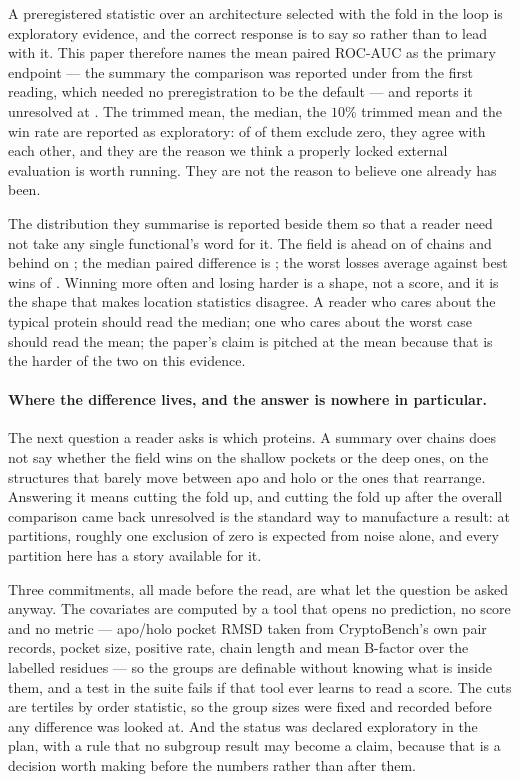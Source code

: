 \documentclass[11pt]{article}
\begin{document}
A preregistered statistic over an architecture selected with the fold in the loop
is exploratory evidence, and the correct response is to say so rather than to
lead with it. This paper therefore names the mean paired ROC-AUC as the primary
endpoint --- the summary the comparison was reported under from the first
reading, which needed no preregistration to be the default --- and reports it
unresolved at \TabAucD{} \TabAucDCI{}. The trimmed mean, the median, the
\(10\%\) trimmed mean and the win rate are reported as exploratory:
\EndNExploratoryResolving{} of \EndNExploratory{} of them exclude zero, they
agree with each other, and they are the reason we think a properly locked
external evaluation is worth running. They are not the reason to believe one
already has been.

The distribution they summarise is reported beside them so that a reader need not
take any single functional's word for it. The field is ahead on \EndWins{} of
\NUnits{} chains and behind on \EndLosses{}; the median paired difference is
\EndMedianDelta{}; the worst losses average \EndWorstLosses{} against best wins
of \EndBestWins{}. Winning more often and losing harder is a shape, not a score,
and it is the shape that makes location statistics disagree. A reader who cares
about the typical protein should read the median; one who cares about the worst
case should read the mean; the paper's claim is pitched at the mean because that
is the harder of the two on this evidence.

\paragraph{Where the difference lives, and the answer is nowhere in particular.}
\label{sec:subgroups}
The next question a reader asks is which proteins. A summary over \NUnits{}
chains does not say whether the field wins on the shallow pockets or the deep
ones, on the structures that barely move between apo and holo or the ones that
rearrange. Answering it means cutting the fold up, and cutting the fold up after
the overall comparison came back unresolved is the standard way to manufacture a
result: at \SgNBandTests{} partitions, roughly one exclusion of zero is expected
from noise alone, and every partition here has a story available for it.

Three commitments, all made before the read, are what let the question be asked
anyway. The \SgNCovariates{} covariates are computed by a tool that opens no
prediction, no score and no metric --- apo/holo pocket RMSD taken from
CryptoBench's own pair records, pocket size, positive rate, chain length and mean
B-factor over the labelled residues --- so the groups are definable without
knowing what is inside them, and a test in the suite fails if that tool ever
learns to read a score. The cuts are tertiles by order statistic, so the group
sizes were fixed and recorded before any difference was looked at. And the status
was declared exploratory in the plan, with a rule that no subgroup result may
become a claim, because that is a decision worth making before the numbers rather
than after them.
\end{document}
